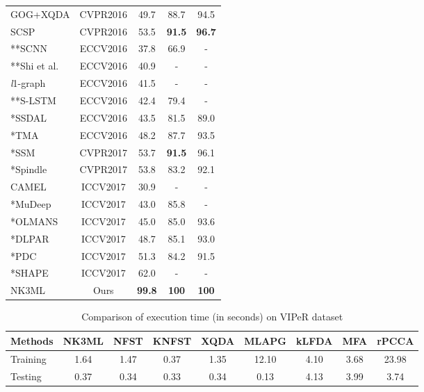 \documentclass[runningheads]{llncs}
\begin{document}
\begin{table}[h]
\begin{center}
{\begin{tabular}{|l|c|c|c|c|}
GOG+XQDA\cite{GOG}	&	CVPR2016	&	49.7	&	88.7	&	94.5	\\
SCSP\cite{SCSP}	&	CVPR2016	&	53.5	&	\color{blue}\textbf{91.5}	&	\color{blue}\textbf{96.7}	\\
**SCNN\cite{SCNN}	&	ECCV2016	&	37.8	&	66.9	&	-	\\
**Shi et al.\cite{Shi}	&	ECCV2016	&	40.9	&	-	&	-	\\
\textit{l}1-graph\cite{UlGraph}	&	ECCV2016	&	41.5	&	-	&	-	\\
**S-LSTM\cite{SLSTM}	&	ECCV2016	&	42.4	&	79.4	&	-	\\
*SSDAL\cite{SSDAL}	&	ECCV2016	&	43.5	&	81.5	&	89.0\\
*TMA\cite{TMA}	&	ECCV2016	&	48.2	&	87.7	&	93.5	\\
*SSM\cite{song:scalableManifold}	&	CVPR2017	&	53.7	&	\color{blue}\textbf{91.5}	&	96.1   \\
*Spindle\cite{SpindleNet} & CVPR2017 & 53.8	&	83.2	&	92.1\\
CAMEL\cite{CAMEL} & ICCV2017 & 30.9 &	-	&	-	\\
*MuDeep & ICCV2017 & 43.0	&	85.8	& - \\
*OLMANS\cite{OnlineNegSamples} & ICCV2017 & 45.0	&	85.0	&	93.6\\
*DLPAR\cite{DLPAR} & ICCV2017 & 48.7	&	85.1	&	93.0\\
*PDC\cite{PDC} & ICCV2017 & 51.3	&	84.2	&	91.5\\
*SHAPE\cite{SHaPE} & ICCV2017 & 62.0 &	-	&	-	\\
\hline\hline
NK3ML &  Ours & \color{red}\textbf{99.8}	&	\color{red}\textbf{100}	& 	\color{red}\textbf{100}\\
\hline
\end{tabular}
}
\end{center}
\end{table}


\begin{table}[h]
\begin{center}
\setlength{\abovecaptionskip}{9pt} 
\caption{Comparison of execution time (in seconds) on VIPeR dataset}
\begin{tabular}{|l|c|c|c|c|c|c|c|c|}
\hline
Methods & NK3ML & NFST& KNFST & XQDA & MLAPG   &  
kLFDA   & MFA  &  rPCCA\\ 
\hline\hline
Training & 	1.64 & 1.47	& 0.37	 & 1.35	&	12.10 &	4.10&	3.68&23.98\\
Testing & 0.37	& 0.34 	& 0.33	&	0.34 & 0.13	&	4.13&	3.99& 3.74\\
\hline
\end{tabular}
\label{table:executionTime}
\end{center}
\end{table}
\end{document}
